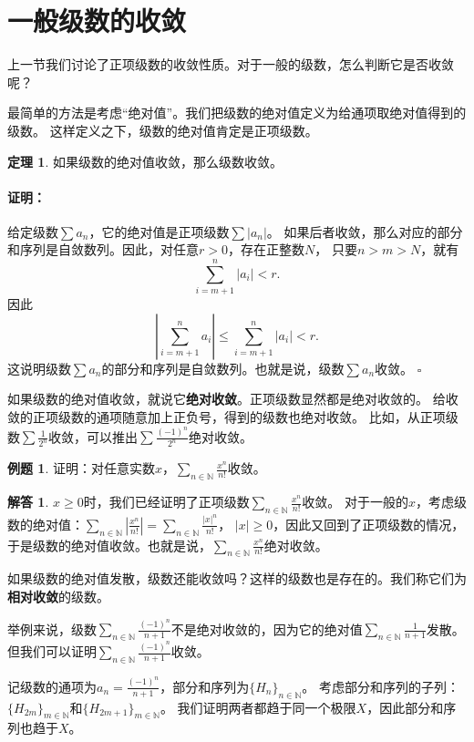 \documentclass[12pt,UTF8]{ctexbook}
\theoremstyle{definition}
\newtheorem{tm}{定理}[section]
\newtheorem{et}{例题}[section]
\newtheorem*{so}{解答}
\theoremstyle{plain}
\renewenvironment{proof}{\paragraph{\textbf{证明：}}}{\hfill$\square$}
\begin{document}
\section{一般级数的收敛}
上一节我们讨论了正项级数的收敛性质。对于一般的级数，怎么判断它是否收敛呢？

最简单的方法是考虑“绝对值”。我们把级数的绝对值定义为给通项取绝对值得到的级数。
这样定义之下，级数的绝对值肯定是正项级数。

\begin{tm}
    如果级数的绝对值收敛，那么级数收敛。
\end{tm}

\begin{proof}
    给定级数$\sum a_n$，它的绝对值是正项级数$\sum |a_n|$。
    如果后者收敛，那么对应的部分和序列是自敛数列。因此，对任意$r>0$，存在正整数$N$，
    只要$n>m>N$，就有
    $$ \sum_{i=m+1}^n |a_i| < r. $$
    因此
    $$ \left|\sum_{i=m+1}^n a_i \right| \leqslant \sum_{i=m+1}^n |a_i| < r. $$
    这说明级数$\sum a_n$的部分和序列是自敛数列。也就是说，级数$\sum a_n$收敛。
\end{proof}

如果级数的绝对值收敛，就说它\textbf{绝对收敛}。正项级数显然都是绝对收敛的。
给收敛的正项级数的通项随意加上正负号，得到的级数也绝对收敛。
比如，从正项级数$\sum \frac{1}{2^n}$收敛，可以推出$\sum \frac{(-1)^{n}}{2^n}$绝对收敛。

\begin{et}
    证明：对任意实数$x$，$\sum_{n\in\mathbb{N}}\frac{x^{n}}{n!}$收敛。
\end{et}
\begin{so}
    $x\geqslant 0$时，我们已经证明了正项级数$\sum_{n\in\mathbb{N}}\frac{x^{n}}{n!}$收敛。
    对于一般的$x$，考虑级数的绝对值：$\sum_{n\in\mathbb{N}}\left|\frac{x^{n}}{n!}\right| = \sum_{n\in\mathbb{N}}\frac{|x|^{n}}{n!}$，
    $|x|\geqslant 0$，因此又回到了正项级数的情况，于是级数的绝对值收敛。也就是说，$\sum_{n\in\mathbb{N}}\frac{x^{n}}{n!}$绝对收敛。
\end{so}

如果级数的绝对值发散，级数还能收敛吗？这样的级数也是存在的。我们称它们为\textbf{相对收敛}的级数。

举例来说，级数$\sum_{n\in\mathbb{N}} \frac{(-1)^{n}}{n+1}$不是绝对收敛的，因为它的绝对值$\sum_{n\in\mathbb{N}} \frac{1}{n+1}$发散。
但我们可以证明$\sum_{n\in\mathbb{N}} \frac{(-1)^{n}}{n+1}$收敛。

记级数的通项为$a_n = \frac{(-1)^{n}}{n+1}$，部分和序列为$\{H_{n}\}_{n\in\mathbb{N}}$。
考虑部分和序列的子列：$\{H_{2m}\}_{m\in\mathbb{N}}$和$\{H_{2m+1}\}_{m\in\mathbb{N}}$。
我们证明两者都趋于同一个极限$X$，因此部分和序列也趋于$X$。
\end{document}

